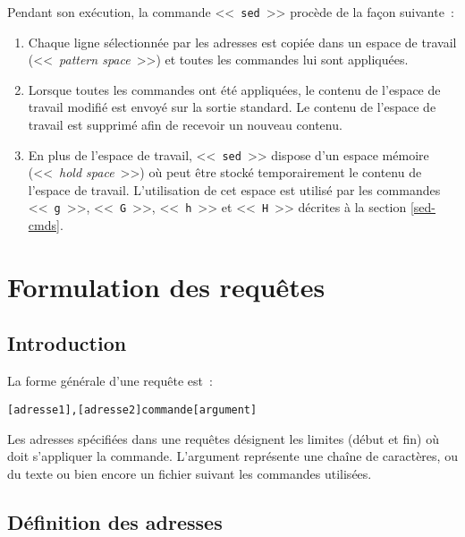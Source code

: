 Pendant son ex{\'e}cution, la commande <<~{\tt sed}~>> proc{\`e}de de la fa\c{c}on suivante~:
\begin{enumerate}
	\item	Chaque ligne s{\'e}lectionn{\'e}e par les adresses est copi{\'e}e dans un
			espace de travail (<<~{\sl pattern space}~>>) et toutes les
			commandes lui sont appliqu{\'e}es.
	\item	Lorsque toutes les commandes ont {\'e}t{\'e} appliqu{\'e}es, le contenu
			de l'espace de travail modifi{\'e} est envoy{\'e} sur la sortie
			standard. Le contenu de l'espace de travail est supprim{\'e} afin
			de recevoir un nouveau contenu.
	\item	En plus de l'espace de travail, <<~{\tt sed}~>> dispose d'un espace m{\'e}moire
			(<<~{\sl hold space}~>>) o{\`u} peut {\^e}tre stock{\'e} temporairement
			le contenu de l'espace de travail. L'utilisation de cet espace
			est utilis{\'e} par les commandes <<~{\tt g}~>>, <<~{\tt G}~>>,
			<<~{\tt h}~>> et <<~{\tt H}~>> d{\'e}crites {\`a} la section
			\ref{sed-cmds}.
\end{enumerate}

\section{Formulation des requ{\^e}tes}

\subsection{Introduction}

La forme g{\'e}n{\'e}rale d'une requ{\^e}te est~:
\begin{center}
\begin{verbatim}
[adresse1],[adresse2]commande[argument]
\end{verbatim}
\end{center}

Les adresses sp{\'e}cifi{\'e}es dans une requ{\^e}tes d{\'e}signent les limites
(d{\'e}but et fin) o{\`u} doit s'appliquer la  commande. L'argument repr{\'e}sente une cha{\^i}ne de caract{\`e}res, ou du texte ou bien encore un fichier suivant les commandes utilis{\'e}es.

\subsection{\label{sed-def-addr}D{\'e}finition des adresses}

